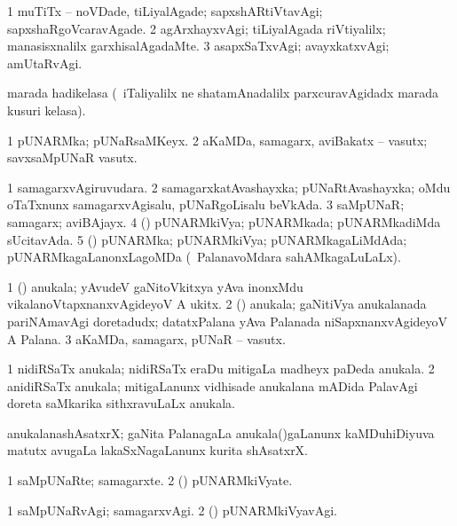 \bentry
{}
\gl{\kirxvi}
\bmng
\bnum
\num{1} muTiTx -- noVDade, tiLiyalAgade; sapxshARtiVtavAgi; sapxshaRgoVcaravAgade. 
\num{2} agArxhayxvAgi; tiLiyalAgada riVtiyalilx; manasisxnalilx garxhisalAgadaMte. 
\num{3} asapxSaTxvAgi; avayxkatxvAgi; amUtaRvAgi. 
\enum
\emng
\eentry

\bentry
{}
\gl{\nA}
\bmng
marada hadikelasa (\kanmu\ iTaliyalilx ne shatamAnadalilx parxcuravAgidadx marada kusuri kelasa). 
\emng
\eentry

\bentry
{}
\gl{\nA}
\bmng
\bnum
\num{1} pUNARMka; pUNaRsaMKeyx. 
\num{2} aKaMDa, samagarx, aviBakatx -- vasutx; savxsaMpUNaR vasutx. 
\enum
\emng
\eentry

\bentry
{}
\gl{\gu}
\bmng
\bnum
\num{1} samagarxvAgiruvudara. 
\num{2} samagarxkatAvashayxka; pUNaRtAvashayxka; oMdu oTaTxnunx samagarxvAgisalu, pUNaRgoLisalu beVkAda. 
\num{3} saMpUNaR; samagarx; aviBAjayx. 
\num{4} (\ga) pUNARMkiVya; pUNARMkada; pUNARMkadiMda sUcitavAda. 
\num{5} (\ga) pUNARMka; pUNARMkiVya; pUNARMkagaLiMdAda; pUNARMkagaLanonxLagoMDa (\udA\ PalanavoMdara sahAMkagaLuLaLx). 
\enum
\emng
\eentry

\bentry
{}
\gl{\nA}
\bmng
\bnum
\num{1} (\ga) anukala; yAvudeV gaNitoVkitxya yAva inonxMdu vikalanoVtapxnanxvAgideyoV A ukitx. 
\num{2} (\ga) anukala; gaNitiVya anukalanada pariNAmavAgi doretadudx; datatxPalana yAva Palanada niSapxnanxvAgideyoV A Palana. 
\num{3} aKaMDa, samagarx, pUNaR -- vasutx. 
\enum
\emng

\noindent
\gl{\pagu}
\bmng
{} 
\bnum
\num{1}  nidiRSaTx anukala; nidiRSaTx eraDu mitigaLa madheyx paDeda anukala. 
\num{2}  anidiRSaTx anukala; mitigaLanunx vidhisade anukalana mADida PalavAgi doreta saMkarika sithxravuLaLx anukala. 
\enum
\emng
\eentry

\bentry
{}
\gl{\nA}
\bmng
anukalanashAsatxrX; gaNita PalanagaLa anukala()gaLanunx kaMDuhiDiyuva matutx avugaLa lakaSxNagaLanunx kurita shAsatxrX. 
\emng
\eentry

\bentry
{}
\gl{\nA}
\bmng
\bnum
\num{1} saMpUNaRte; samagarxte. 
\num{2} (\ga) pUNARMkiVyate. 
\enum
\emng
\eentry

\bentry
{}
\gl{\kirxvi}
\bmng
\bnum
\num{1} saMpUNaRvAgi; samagarxvAgi. 
\num{2} (\ga) pUNARMkiVyavAgi. 
\enum
\emng
\eentry

